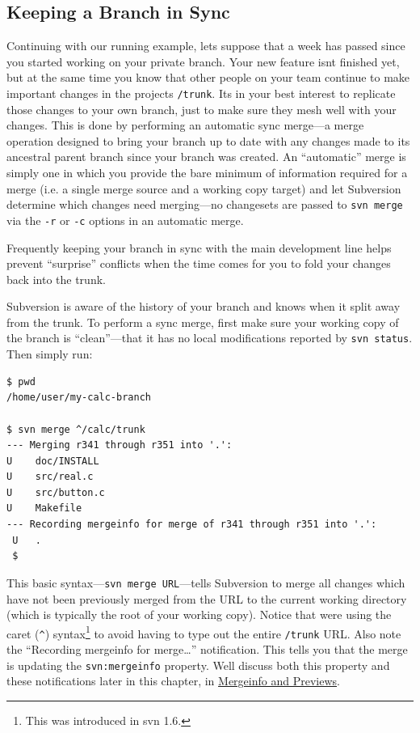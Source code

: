 \subsection{Keeping a Branch in
Sync}\label{svn.branchmerge.basicmerging.stayinsync}

Continuing with our running example, let\textquotesingle s suppose that
a week has passed since you started working on your private branch. Your
new feature isn\textquotesingle t finished yet, but at the same time you
know that other people on your team continue to make important changes
in the project\textquotesingle s \texttt{/trunk}. It\textquotesingle s
in your best interest to replicate those changes to your own branch,
just to make sure they mesh well with your changes. This is done by
performing an automatic sync merge---a merge operation designed to bring
your branch up to date with any changes made to its ancestral parent
branch since your branch was created. An ``automatic'' merge is simply
one in which you provide the bare minimum of information required for a
merge (i.e. a single merge source and a working copy target) and let
Subversion determine which changes need merging---no changesets are
passed to \texttt{svn\ merge} via the \texttt{-r} or \texttt{-c} options
in an automatic merge.

Frequently keeping your branch in sync with the main development line
helps prevent ``surprise'' conflicts when the time comes for you to fold
your changes back into the trunk.

Subversion is aware of the history of your branch and knows when it
split away from the trunk. To perform a sync merge, first make sure your
working copy of the branch is ``clean''---that it has no local
modifications reported by \texttt{svn\ status}. Then simply run:

\begin{verbatim}
$ pwd
/home/user/my-calc-branch

$ svn merge ^/calc/trunk
--- Merging r341 through r351 into '.':
U    doc/INSTALL
U    src/real.c
U    src/button.c
U    Makefile
--- Recording mergeinfo for merge of r341 through r351 into '.':
 U   .
 $
\end{verbatim}

This basic syntax---\texttt{svn\ merge\ URL}---tells Subversion to merge
all changes which have not been previously merged from the URL to the
current working directory (which is typically the root of your working
copy). Notice that we\textquotesingle re using the caret (\texttt{\^{}})
syntax\footnote{This was introduced in svn 1.6.} to avoid having to type
out the entire \texttt{/trunk} URL. Also note the ``Recording mergeinfo
for merge\ldots{}'' notification. This tells you that the merge is
updating the \texttt{svn:mergeinfo} property. We\textquotesingle ll
discuss both this property and these notifications later in this
chapter, in \hyperref[svn.branchmerge.basicmerging.mergeinfo]{Mergeinfo
and Previews}.

